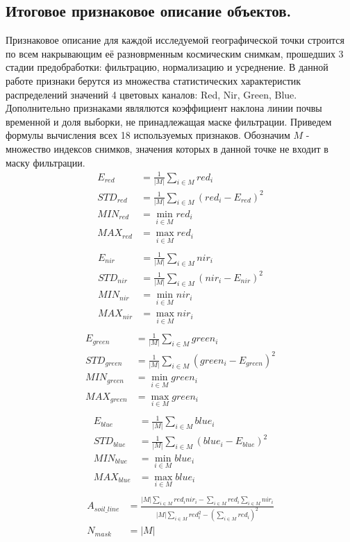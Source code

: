 \documentclass[12pt]{article}
\begin{document}
\subsection{Итоговое признаковое описание объектов.}

Признаковое описание для каждой исследуемой географической точки строится по всем накрывающим
её разноврменным космическим снимкам, прошедших 3 стадии предобработки: фильтрацию,
нормализацию и усреднение. В данной работе признаки берутся из множества статистических
характеристик распределений значений 4 цветовых каналов: Red, Nir, Green, Blue. Дополнительно
признаками являлются коэффициент наклона линии почвы временной и доля выборки, не принадлежащая
маске фильтрации. Приведем формулы вычисления всех 18 используемых признаков. Обозначим 
$M$ - множество индексов снимков, значения которых в данной точке не входит в маску фильтрации.
\begin{align*}
    E_{red} &= \frac{1}{|M|}\sum_{i \in M} red_i \\
    STD_{red} &= \frac{1}{|M|}\sum_{i \in M} (red_i - E_{red})^2 \\
    MIN_{red} &= \min_{i \in M} red_i \\
    MAX_{red} &= \max_{i \in M} red_i \\
\end{align*}
\begin{align*}
    E_{nir} &= \frac{1}{|M|}\sum_{i \in M} nir_i \\
    STD_{nir} &= \frac{1}{|M|}\sum_{i \in M} (nir_i - E_{nir})^2 \\
    MIN_{nir} &= \min_{i \in M} nir_i \\
    MAX_{nir} &= \max_{i \in M} nir_i \\
\end{align*}
\begin{align*}
    E_{green} &= \frac{1}{|M|}\sum_{i \in M} green_i \\
    STD_{green} &= \frac{1}{|M|}\sum_{i \in M} (green_i - E_{green})^2 \\
    MIN_{green} &= \min_{i \in M} green_i \\
    MAX_{green} &= \max_{i \in M} green_i \\
\end{align*}
\begin{align*}
    E_{blue} &= \frac{1}{|M|}\sum_{i \in M} blue_i \\
    STD_{blue} &= \frac{1}{|M|}\sum_{i \in M} (blue_i - E_{blue})^2 \\
    MIN_{blue} &= \min_{i \in M} blue_i \\
    MAX_{blue} &= \max_{i \in M} blue_i \\
\end{align*}
\begin{align*}
    A_{soil\_line} &= \frac{|M|\sum_{i \in M} red_i nir_i - 
                            \sum_{i \in M} red_i \sum_{i \in M} nir_i}
                           {|M|\sum_{i \in M} red_i^2 - 
                            \left(\sum_{i \in M} red_i\right)^2} \\
    N_{mask} &= |M|
\end{align*}
\end{document}
